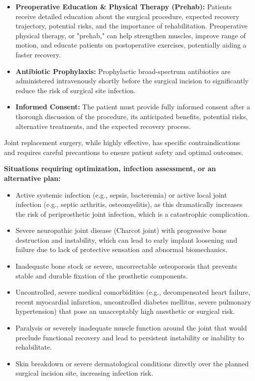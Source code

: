 \begin{itemize}
  \item \textbf{Preoperative Education \& Physical Therapy (Prehab):} Patients receive detailed education about the surgical procedure, expected recovery trajectory, potential risks, and the importance of rehabilitation. Preoperative physical therapy, or "prehab," can help strengthen muscles, improve range of motion, and educate patients on postoperative exercises, potentially aiding a faster recovery.
  \item \textbf{Antibiotic Prophylaxis:} Prophylactic broad-spectrum antibiotics are administered intravenously shortly before the surgical incision to significantly reduce the risk of surgical site infection.
  \item \textbf{Informed Consent:} The patient must provide fully informed consent after a thorough discussion of the procedure, its anticipated benefits, potential risks, alternative treatments, and the expected recovery process.
\end{itemize}

Joint replacement surgery, while highly effective, has specific contraindications and requires careful precautions to ensure patient safety and optimal outcomes.

\textbf{Situations requiring optimization, infection assessment, or an alternative plan:}
\begin{itemize}
  \item Active systemic infection (e.g., sepsis, bacteremia) or active local joint infection (e.g., septic arthritis, osteomyelitis), as this dramatically increases the risk of periprosthetic joint infection, which is a catastrophic complication.
  \item Severe neuropathic joint disease (Charcot joint) with progressive bone destruction and instability, which can lead to early implant loosening and failure due to lack of protective sensation and abnormal biomechanics.
  \item Inadequate bone stock or severe, uncorrectable osteoporosis that prevents stable and durable fixation of the prosthetic components.
  \item Uncontrolled, severe medical comorbidities (e.g., decompensated heart failure, recent myocardial infarction, uncontrolled diabetes mellitus, severe pulmonary hypertension) that pose an unacceptably high anesthetic or surgical risk.
  \item Paralysis or severely inadequate muscle function around the joint that would preclude functional recovery and lead to persistent instability or inability to rehabilitate.
  \item Skin breakdown or severe dermatological conditions directly over the planned surgical incision site, increasing infection risk.
\end{itemize}

